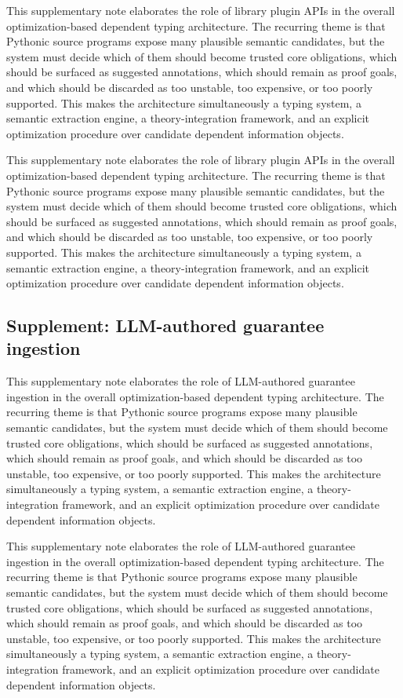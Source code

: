 \documentclass[11pt]{article}
\theoremstyle{definition}
\theoremstyle{plain}
\begin{document}
This supplementary note elaborates the role of library plugin APIs in the overall
optimization-based dependent typing architecture. The recurring theme is that
Pythonic source programs expose many plausible semantic candidates, but the
system must decide which of them should become trusted core obligations, which
should be surfaced as suggested annotations, which should remain as proof
goals, and which should be discarded as too unstable, too expensive, or too
poorly supported. This makes the architecture simultaneously a typing system,
a semantic extraction engine, a theory-integration framework, and an explicit
optimization procedure over candidate dependent information objects.

This supplementary note elaborates the role of library plugin APIs in the overall
optimization-based dependent typing architecture. The recurring theme is that
Pythonic source programs expose many plausible semantic candidates, but the
system must decide which of them should become trusted core obligations, which
should be surfaced as suggested annotations, which should remain as proof
goals, and which should be discarded as too unstable, too expensive, or too
poorly supported. This makes the architecture simultaneously a typing system,
a semantic extraction engine, a theory-integration framework, and an explicit
optimization procedure over candidate dependent information objects.

\subsection{Supplement: LLM-authored guarantee ingestion}
This supplementary note elaborates the role of LLM-authored guarantee ingestion in the overall
optimization-based dependent typing architecture. The recurring theme is that
Pythonic source programs expose many plausible semantic candidates, but the
system must decide which of them should become trusted core obligations, which
should be surfaced as suggested annotations, which should remain as proof
goals, and which should be discarded as too unstable, too expensive, or too
poorly supported. This makes the architecture simultaneously a typing system,
a semantic extraction engine, a theory-integration framework, and an explicit
optimization procedure over candidate dependent information objects.

This supplementary note elaborates the role of LLM-authored guarantee ingestion in the overall
optimization-based dependent typing architecture. The recurring theme is that
Pythonic source programs expose many plausible semantic candidates, but the
system must decide which of them should become trusted core obligations, which
should be surfaced as suggested annotations, which should remain as proof
goals, and which should be discarded as too unstable, too expensive, or too
poorly supported. This makes the architecture simultaneously a typing system,
a semantic extraction engine, a theory-integration framework, and an explicit
optimization procedure over candidate dependent information objects.
\end{document}
